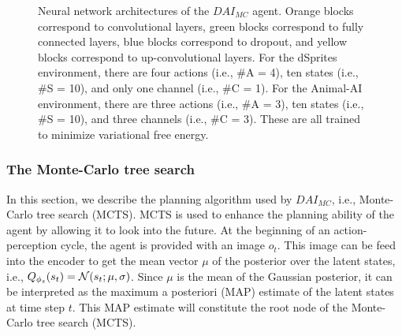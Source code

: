 \documentclass[twoside,11pt]{article}
\let\oldmathcal\mathcal
\renewcommand{\mathcal}[1]{%
  \IfSubStr{ABCDEFGHIJKLMNOPQRSTUVWXYZ}{#1}{\oldmathcal{#1}}{\mathdutchcal{#1}}
}
\begin{document}
\begin{figure}
\begin{center}
	\end{center}
	\caption{Neural network architectures of the $DAI_{MC}$ agent. Orange blocks correspond to convolutional layers, green blocks correspond to fully connected layers, blue blocks correspond to dropout, and yellow blocks correspond to up-convolutional layers. For the dSprites environment, there are four actions (i.e., \#A = 4), ten states (i.e., \#S = 10), and only one channel (i.e., \#C = 1). For the Animal-AI environment, there are three actions (i.e., \#A = 3), ten states (i.e., \#S = 10), and three channels (i.e., \#C = 3). These are all trained to minimize variational free energy.}
	\label{fig:fountas_dnn}
\end{figure}

\subsubsection{The Monte-Carlo tree search}

In this section, we describe the planning algorithm used by $DAI_{MC}$, i.e., Monte-Carlo tree search (MCTS). MCTS is used to enhance the planning ability of the agent by allowing it to look into the future. At the beginning of an action-perception cycle, the agent is provided with an image $o_t$. This image can be feed into the encoder to get the mean vector $\mu$ of the posterior over the latent states, i.e., $Q_{\phi_s}(s_t) = \mathcal{N}(s_t;\mu, \sigma)$. Since $\mu$ is the mean of the Gaussian posterior, it can be interpreted as the maximum a posteriori (MAP) estimate of the latent states at time step $t$. This MAP estimate will constitute the root node of the Monte-Carlo tree search (MCTS).
\end{document}
